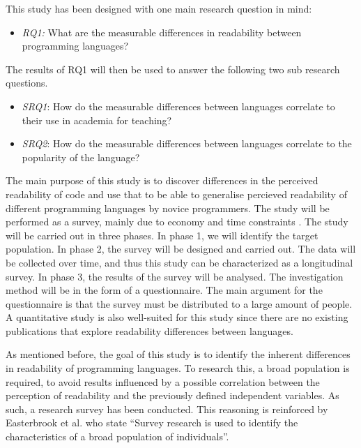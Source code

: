 \documentclass[times, 10pt,twocolumn]{IEEEtran}
\begin{document}
This study has been designed with one main research question in mind:
\begin{itemize}
\item \textit{RQ1:} What are the measurable differences in readability between programming languages?
\end{itemize}


The results of RQ1 will then be used to answer the following two sub research questions. 
\begin{itemize}
\item \textit{SRQ1}: How do the measurable differences between languages correlate to their use in academia for teaching?
\item \textit{SRQ2}: How do the measurable differences between languages correlate to the popularity of the language?
\end{itemize}


The main purpose of this study is to discover differences in the perceived readability of code and use that to be able to generalise percieved readability of different programming languages by novice programmers. The study will be performed as a survey, mainly due to economy and time constraints \cite{fowler2008survey}. The study will be carried out in three phases. In phase 1, we will identify the target population. In phase 2, the survey will be designed and carried out. The data will be collected over time, and thus this study can be characterized as a longitudinal survey. In phase 3, the results of the survey will be analysed. The investigation method will be in the form of a questionnaire. The main argument for the questionnaire is that the survey must be distributed to a large amount of people. A quantitative study is also well-suited for this study since there are no existing publications that explore readability differences between languages. 


As mentioned before, the goal of this study is to identify the inherent differences in readability of programming languages. To research this, a broad population is required, to avoid results influenced by a possible correlation between the perception of readability and the previously defined independent variables. As such, a research survey has been conducted. This reasoning is reinforced by Easterbrook et al. \cite{easterbrook2008selecting} who state ``Survey research is used to identify the characteristics of a broad population of individuals''. 
\newline
\end{document}
